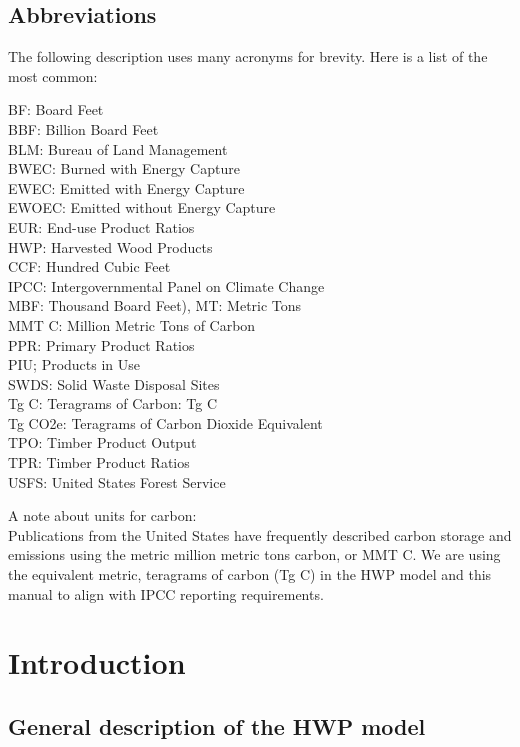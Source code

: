 \documentclass[
]{book}
\begin{document}
\hypertarget{sum-abb}{%
\section{Abbreviations}\label{sum-abb}}

The following description uses many acronyms for brevity. Here is a list of the most common:

BF: Board Feet\\
BBF: Billion Board Feet\\
BLM: Bureau of Land Management\\
BWEC: Burned with Energy Capture\\
EWEC: Emitted with Energy Capture\\
EWOEC: Emitted without Energy Capture\\
EUR: End-use Product Ratios\\
HWP: Harvested Wood Products\\
CCF: Hundred Cubic Feet\\
IPCC: Intergovernmental Panel on Climate Change\\
MBF: Thousand Board Feet),
MT: Metric Tons\\
MMT C: Million Metric Tons of Carbon\\
PPR: Primary Product Ratios\\
PIU; Products in Use\\
SWDS: Solid Waste Disposal Sites\\
Tg C: Teragrams of Carbon: Tg C\\
Tg CO2e: Teragrams of Carbon Dioxide Equivalent\\
TPO: Timber Product Output\\
TPR: Timber Product Ratios\\
USFS: United States Forest Service

A note about units for carbon:\\
Publications from the United States have frequently described carbon storage and emissions using the metric million metric tons carbon, or MMT C. We are using the equivalent metric, teragrams of carbon (Tg C) in the HWP model and this manual to align with IPCC reporting requirements.

\hypertarget{int}{%
\chapter{Introduction}\label{int}}

\hypertarget{int-gen}{%
\section{General description of the HWP model}\label{int-gen}}
\end{document}
